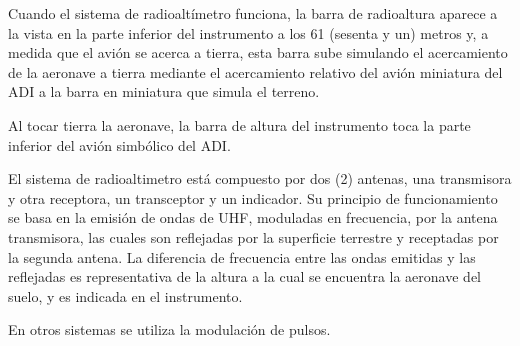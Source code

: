 \documentclass[a4paper,12pt,twoside]{article}
\begin{document}
Cuando el sistema de radioalt\'imetro funciona, la barra de radioaltura aparece a la vista
en la parte inferior del instrumento a los 61 (sesenta y un) metros y, a medida que
el avi\'on se acerca a tierra, esta barra sube simulando el acercamiento de la aeronave
a tierra mediante el acercamiento relativo del avi\'on miniatura del ADI
a la barra en miniatura que simula el terreno.

Al tocar tierra la aeronave, la barra de altura del instrumento toca la parte
inferior del avi\'on simb\'olico del ADI.

El sistema de radioaltimetro est\'a compuesto por dos (2) antenas, una transmisora
y otra receptora, un transceptor y un indicador.
Su principio de funcionamiento se basa en la emisi\'on de ondas de UHF, moduladas
en frecuencia, por la antena transmisora, las cuales son reflejadas por la superficie
terrestre y receptadas por la segunda antena. La diferencia de frecuencia entre
las ondas emitidas y las reflejadas es representativa de la altura a la cual se
encuentra la aeronave del suelo, y es indicada en el instrumento.

En otros sistemas se utiliza la modulaci\'on de pulsos.
\end{document}
